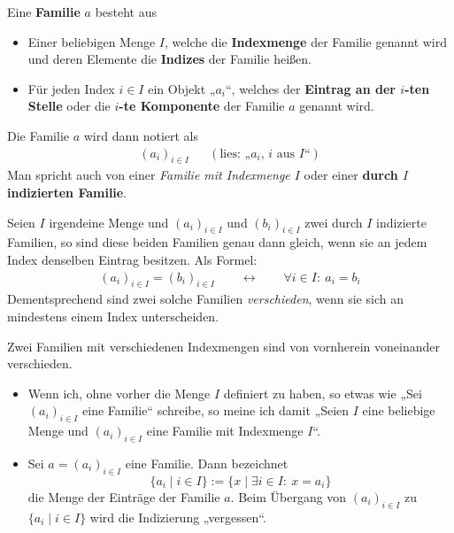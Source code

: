 \begin{de}[Familien] \label{def:familie}   
    Eine \textbf{Familie} $a$ besteht aus
    \begin{itemize}
        \item Einer beliebigen Menge $I$, welche die \textbf{Indexmenge} der Familie genannt wird und deren Elemente die \textbf{Indizes} der Familie heißen.
        \item Für jeden Index $i\in I$ ein Objekt „$a_i$“, welches der \textbf{Eintrag an der $i$-ten Stelle} oder die \textbf{$i$-te Komponente} der Familie $a$ genannt wird.
    \end{itemize}
    Die Familie $a$ wird dann notiert als
    \begin{align*}
        (a_i)_{i\in I} && (\text{lies: „$a_i$, $i$ aus $I$“})
    \end{align*}
    Man spricht auch von einer \emph{Familie mit Indexmenge $I$} oder einer \textbf{durch $I$ indizierten Familie}.
\end{de}


\begin{axiom} \label{familiengleich}
    Seien $I$ irgendeine Menge und $(a_i)_{i\in I}$ und $(b_i)_{i\in I}$ zwei durch $I$ indizierte Familien, so sind diese beiden Familien genau dann gleich, wenn sie an jedem Index denselben Eintrag besitzen. Als Formel:
    \begin{align*}
        (a_i)_{i\in I}=(b_i)_{i\in I} \qquad\leftrightarrow\qquad \forall i\in I:\ a_i=b_i
    \end{align*}
    Dementsprechend sind zwei solche Familien \emph{verschieden}, wenn sie sich an mindestens einem Index unterscheiden.
    
    Zwei Familien mit verschiedenen Indexmengen sind von vornherein voneinander verschieden.
\end{axiom}


\begin{nota} \label{mengeeinerfamilie} \quad
    \begin{itemize}
        \item Wenn ich, ohne vorher die Menge $I$ definiert zu haben, so etwas wie „Sei $(a_i)_{i\in I}$ eine Familie“ schreibe, so meine ich damit „Seien $I$ eine beliebige Menge und $(a_i)_{i\in I}$ eine Familie mit Indexmenge $I$“.
        \item Sei $a=(a_i)_{i\in I}$ eine Familie. Dann bezeichnet
            \[ \{a_i \mid i\in I\} := \{x\mid \exists i\in I:\ x=a_i \} \]
        die Menge der Einträge der Familie $a$. Beim Übergang von $(a_i)_{i\in I}$ zu $\{a_i\mid i\in I\}$ wird die Indizierung „vergessen“.
    \end{itemize}
\end{nota}


